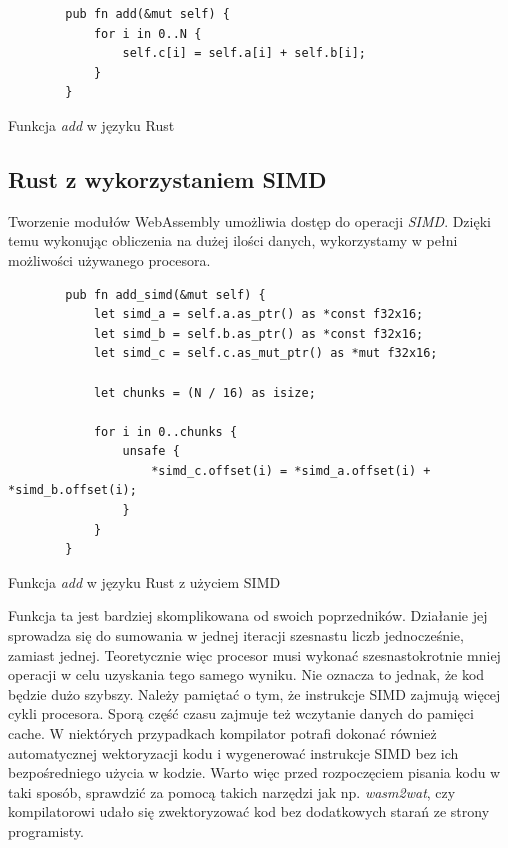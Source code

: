 \documentclass[language=polish,type=master]{aghmodern}
\begin{document}
\begin{listing}[H]
    \begin{verbatim}
        pub fn add(&mut self) {
            for i in 0..N {
                self.c[i] = self.a[i] + self.b[i];
            }
        }
    \end{verbatim}
    \caption{Funkcja \emph{add} w języku Rust}
\end{listing}

\subsection{Rust z wykorzystaniem SIMD}
Tworzenie modułów WebAssembly umożliwia dostęp do operacji \emph{SIMD}\footnotemark{}.
Dzięki temu wykonując obliczenia na dużej ilości danych, wykorzystamy w pełni możliwości używanego procesora.

\begin{listing}[H]
    \begin{verbatim}
        pub fn add_simd(&mut self) {
            let simd_a = self.a.as_ptr() as *const f32x16;
            let simd_b = self.b.as_ptr() as *const f32x16;
            let simd_c = self.c.as_mut_ptr() as *mut f32x16;
    
            let chunks = (N / 16) as isize;

            for i in 0..chunks {
                unsafe {
                    *simd_c.offset(i) = *simd_a.offset(i) + *simd_b.offset(i);
                }
            }
        }
    \end{verbatim}
    \caption{Funkcja \emph{add} w języku Rust z użyciem SIMD}
\end{listing}

Funkcja ta jest bardziej skomplikowana od swoich poprzedników.
Działanie jej sprowadza się do sumowania w jednej iteracji szesnastu liczb jednocześnie, zamiast jednej.
Teoretycznie więc procesor musi wykonać szesnastokrotnie mniej operacji w celu uzyskania tego samego wyniku.
Nie oznacza to jednak, że kod będzie dużo szybszy.
Należy pamiętać o tym, że instrukcje SIMD zajmują więcej cykli procesora.
Sporą część czasu zajmuje też wczytanie danych do pamięci cache.
W niektórych przypadkach kompilator potrafi dokonać również automatycznej wektoryzacji kodu i wygenerować instrukcje SIMD bez ich bezpośredniego użycia w kodzie.
Warto więc przed rozpoczęciem pisania kodu w taki sposób, sprawdzić za pomocą takich narzędzi jak np. \emph{wasm2wat}\footnotemark{}, czy kompilatorowi udało się zwektoryzować kod bez dodatkowych starań ze strony programisty.
\end{document}
